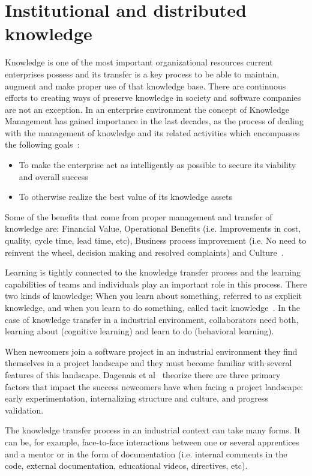 \documentclass[12pt, letterpaper]{article}
\begin{document}
\section{Institutional and distributed knowledge}
Knowledge is one of the most important organizational resources current enterprises possess
and its transfer is a key process to be able to maintain, augment and
make proper use of that knowledge base. 
There are continuous efforts to creating ways of preserve knowledge in society and software 
companies are not an exception. In an enterprise environment the concept of Knowledge Management
has gained importance in the last decades, as the process of dealing with the management 
of knowledge and its related activities which encompasses 
the following goals~\cite{wiig97}: 
\begin{itemize}
\item To make the enterprise act as intelligently as possible to secure its viability and overall success
\item To otherwise realize the best value of its knowledge assets
\end{itemize}
Some of the benefits that come from proper management and transfer of knowledge are: Financial
Value, Operational Benefits (i.e. Improvements in cost, quality, cycle time, lead time, etc), Business process improvement (i.e. No need to reinvent the wheel, decision making and resolved complaints) and Culture~\cite{ibrahim09}. 

Learning is tightly connected to the knowledge transfer
process and the learning capabilities of teams and individuals play an important role in 
this process.
There two kinds of knowledge: When you learn about something, referred to as explicit 
knowledge, and when you learn to do something, called tacit knowledge~\cite{cook99}. 
In the case of knowledge transfer in a industrial environment, collaborators need both, 
learning about (cognitive learning) and learn to do (behavioral learning).

When newcomers join a software project in an industrial environment they find themselves in a project
landscape and they must become familiar with several features of this landscape.
Dagenais et al~\cite{Dagenais10} theorize there are three primary factors that impact the 
success newcomers have when facing a project landscape: early experimentation, internalizing structure
and culture, and progress validation.

The knowledge transfer process in an industrial context can take many forms. It can be, for example,
face-to-face interactions between one or several apprentices and a mentor or in the form of documentation 
(i.e. internal comments in the code, external documentation, educational videos, directives, etc). 
\end{document}
